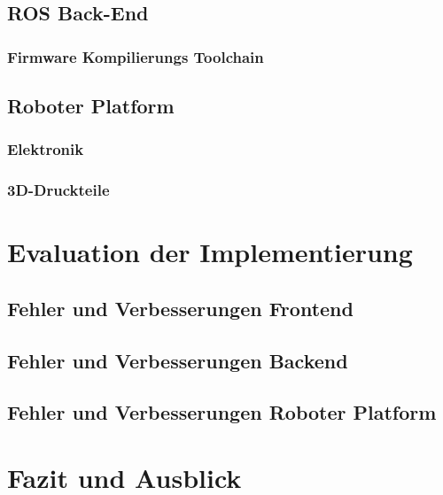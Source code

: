 \documentclass[11pt,twoside,a4paper,titlepage]{article}
\begin{document}
\subsection{ROS Back-End}
\subsubsection{Firmware Kompilierungs Toolchain}



\subsection{Roboter Platform}
\subsubsection{Elektronik}
\subsubsection{3D-Druckteile}

\section{Evaluation der Implementierung}

\subsection{Fehler und Verbesserungen Frontend}
\subsection{Fehler und Verbesserungen Backend}
\subsection{Fehler und Verbesserungen Roboter Platform}

\section{Fazit und Ausblick}
\end{document}
